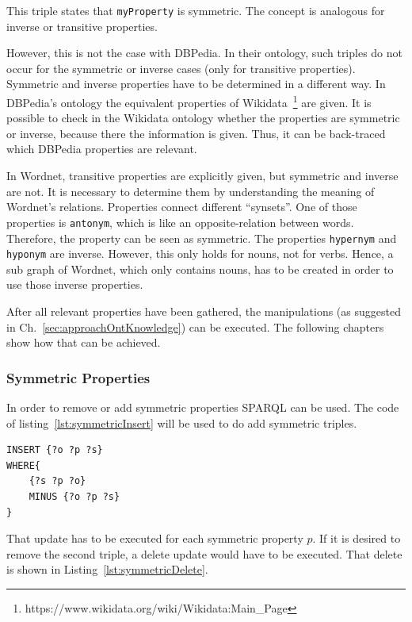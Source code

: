This triple states that {\tt myProperty} is symmetric. The concept is analogous for inverse or transitive properties. 

However, this is not the case with DBPedia. In their ontology, such triples do not occur for the symmetric or inverse cases (only for transitive properties). Symmetric and inverse properties have to be determined in a different way. In DBPedia's ontology the equivalent properties of Wikidata~\footnote{https://www.wikidata.org/wiki/Wikidata:Main\_Page} are given. It is possible to check in the Wikidata ontology whether the properties are symmetric or inverse, because there the information is given. Thus, it can be  back-traced which DBPedia properties are relevant.

In Wordnet, transitive properties are explicitly given, but symmetric and inverse are not. It is necessary to determine them by understanding the meaning of Wordnet's relations. Properties connect different \enquote{synsets}. One of those properties is {\tt antonym}, which is like an opposite-relation between words. Therefore, the property can be seen as symmetric. The properties {\tt hypernym} and {\tt hyponym} are inverse. However, this only holds for nouns, not for verbs. Hence, a sub graph of Wordnet, which only contains nouns, has to be created in order to use those inverse properties.

After all relevant properties have been gathered, the manipulations (as suggested in Ch.~\ref{sec:approachOntKnowledge}) can be executed. The following chapters show how that can be achieved.

\subsubsection{Symmetric Properties}

In order to remove or add symmetric properties SPARQL can be used. The code of listing~\ref{lst:symmetricInsert} will be used to do add symmetric triples.

\begin{lstlisting}[captionpos=b, caption=SPARQL update for adding triples with the symmetric property p., label=lst:symmetricInsert,
basicstyle=\ttfamily,frame=single,float=hbt,]
INSERT {?o ?p ?s}
WHERE{
	{?s ?p ?o}
	MINUS {?o ?p ?s}
}
\end{lstlisting}

That update has to be executed for each symmetric property $p$. If it is desired to remove the second triple, a delete update would have to be executed. That delete is shown in Listing~\ref{lst:symmetricDelete}.


